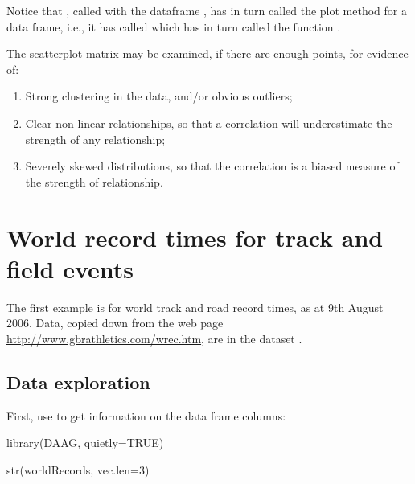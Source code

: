 Notice that , called with the dataframe ,
has in turn called the plot method for a data frame, i.e.,
it has called  which has in turn called
the function .

The scatterplot matrix may be examined, if there are enough
points, for evidence of:
\begin{enumerate}
\item Strong clustering in the data, and/or
obvious outliers;
\item Clear non-linear relationships, so that a
correlation will underestimate the strength of any relationship;
\item Severely skewed distributions, so that the correlation is a biased
measure of the strength of relationship.
\end{enumerate}

\section{World record times for track and field events}\label{sec:wr}

The first example is for world track and road record times,
 as at 9th August 2006.  Data,
copied down from the web page
\url{http://www.gbrathletics.com/wrec.htm}, are in the dataset
.

\subsection*{Data exploration}
First, use  to get information on the data frame columns:

\begin{Schunk}
\begin{Sinput}
library(DAAG, quietly=TRUE)
\end{Sinput}
\end{Schunk}

\begin{fullwidth}
\begin{Schunk}
\begin{Sinput}
str(worldRecords, vec.len=3)
\end{Sinput}
\end{Schunk}
\end{fullwidth}


